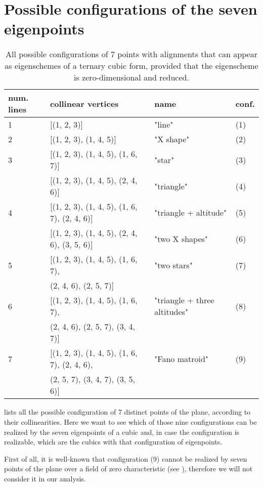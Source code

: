 \documentclass{amsart}
\theoremstyle{plain}
\theoremstyle{definition}
\begin{document}
\section{Possible configurations of the seven eigenpoints}
\label{further_alignments}

\begin{table}
\caption{All possible configurations of $7$ points with alignments that can appear as eigenschemes of a ternary cubic form, provided that the eigenscheme is zero-dimensional and reduced.}
\centering
\begin{tabular}{|llll|}\hline
  num. lines  & collinear vertices & name & conf.\\ \hline
 1& [(1, 2, 3)] & "line" & (1)\\
 2& [(1, 2, 3), (1, 4, 5)] & "X shape"& (2)\\
 3& [(1, 2, 3), (1, 4, 5), (1, 6, 7)] & "star" & (3)\\
  & [(1, 2, 3), (1, 4, 5), (2, 4, 6)] & "triangle" & (4)\\
 4& [(1, 2, 3), (1, 4, 5), (1, 6, 7), (2, 4, 6)] & "triangle + altitude" & (5)\\
  & [(1, 2, 3), (1, 4, 5), (2, 4, 6), (3, 5, 6)] & "two X shapes" & (6)\\
 5& [(1, 2, 3), (1, 4, 5), (1, 6, 7),  & "two stars" & (7)\\
  & \phantom{[}(2, 4, 6), (2, 5, 7)] & &\\
 6& [(1, 2, 3), (1, 4, 5), (1, 6, 7), & "triangle + three altitudes" & (8)\\
  & \phantom{[} (2, 4, 6), (2, 5, 7), (3, 4, 7)] & & \\
 7& [(1, 2, 3),
   (1, 4, 5),
   (1, 6, 7),
   (2, 4, 6), & "Fano matroid" & (9)\\
  & \phantom{[} (2, 5, 7),
   (3, 4, 7),
   (3, 5, 6)] & & \\ \hline
\end{tabular}
\label{table:all_alignments}
\end{table}

 lists all the possible configuration
of 7 distinct points of the plane, according to their collinearities. Here
we want to see which of those nine configurations can be realized by
the seven eigenpoints of a cubic and, in case the configuration is
realizable, which are the cubics with that configuration of eigenpoints.

First of all, it is well-known that configuration (9) cannot be realized
by seven points of the plane over a field of zero
characteristic (see \cite{Whitney1935}), therefore we will not consider
it in our analysis.
\end{document}
